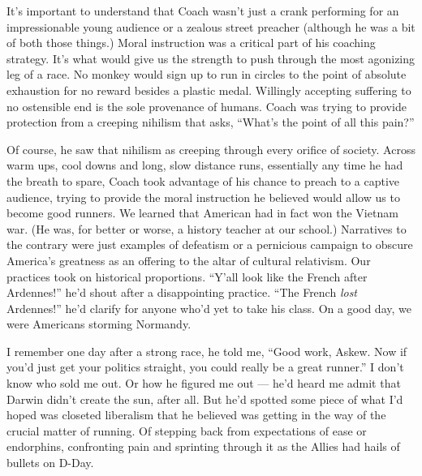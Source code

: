 \documentclass[12pt, oneside]{memoir}
\begin{document}

It's important to understand that Coach wasn't just a crank performing
for an impressionable young audience or a zealous street preacher
(although he was a bit of both those things.)
Moral instruction was a critical part of his coaching strategy.
It's what would give us the strength to push through the most
agonizing leg of a race.
No monkey would sign up to run in circles to the point of absolute
exhaustion for no reward besides a plastic medal.
Willingly accepting suffering to no ostensible end is the sole
provenance of humans.
Coach was trying to provide protection from a creeping nihilism that
asks, ``What's the point of all this pain?''

Of course, he saw that nihilism as creeping through every orifice of
society.
Across warm ups, cool downs and long, slow distance runs, essentially
any time he had the breath to spare, Coach took advantage of his
chance to preach to a captive audience, trying to provide the moral
instruction he believed would allow us to become good runners.
We learned that American had in fact won the Vietnam war.
(He was, for better or worse, a history teacher at our school.)
Narratives to the contrary were just examples of defeatism or a
pernicious campaign to obscure America's greatness as an offering to
the altar of cultural relativism.
Our practices took on historical proportions.
``Y'all look like the French after Ardennes!'' he'd shout after a
disappointing practice.
``The French \textit{lost} Ardennes!'' he'd clarify for anyone who'd
yet to take his class.
On a good day, we were Americans storming Normandy.

I remember one day after a strong race, he told me, ``Good work,
Askew. Now if you'd just get your politics straight, you could really
be a great runner.''
I don't know who sold me out.
Or how he figured me out --- he'd heard me admit that Darwin didn't
create the sun, after all.
But he'd spotted some piece of what I'd hoped was closeted liberalism
that he believed was getting in the way of the crucial matter of
running.
Of stepping back from expectations of ease or endorphins, confronting
pain and sprinting through it as the Allies had hails of bullets on
D-Day.
\end{document}
